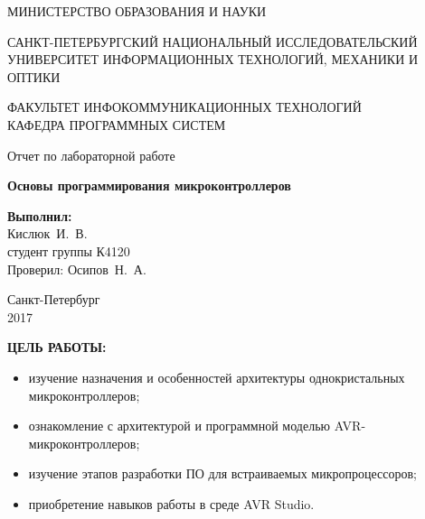 \documentclass[14pt,a4paper]{extreport}
\newcommand{\header}[1]{%
{
\clearpage%
\fontsize{16pt}{14pt}\selectfont
\begin{center}
\textbf{\MakeUppercase{#1}:}
\end{center}
}
}
\newcommand{\labyear}{2017}
\newcommand{\labtitle}{Основы программирования микроконтроллеров}
\newcommand{\prepod}{Осипов~Н.~А.}
\newcommand{\student}{Кислюк~И.~В.}
\begin{document}
	\begin{titlepage}
	\begin{center}	
		\fontsize{14pt}{14pt}\selectfont
		МИНИСТЕРСТВО ОБРАЗОВАНИЯ И НАУКИ\\

		\vspace*{0.6\baselineskip}

		\MakeUppercase{Санкт-Петербургский Национальный Исследовательский Университет Информационных технологий, механики и оптики}		
		
		\vspace*{0.6\baselineskip}
		\MakeUppercase{Факультет Инфокоммуникационных технологий}\\
		\MakeUppercase{Кафедра программных систем}
	
		\vspace*{7\baselineskip}
		\fontsize{19pt}{18pt}\selectfont
		Отчет по лабораторной работе
		
		\fontsize{20pt}{18pt}\selectfont
		\textbf{\labtitle}\\
		\vspace*{1.15\baselineskip}
		\end{center}
	
	\vspace*{2\baselineskip}
	\begin{flushright}
	\fontsize{14pt}{14pt}\selectfont
	\textbf{Выполнил:}\\
	\student\\
	студент группы К4120\\
	Проверил: \prepod\\
	\end{flushright}
	
	\vspace{\fill}
	\begin{center}
	Санкт-Петербург\\
	\vspace{-1ex}
	\labyear
	\end{center}
	
\end{titlepage}

\fontsize{14pt}{14pt}\selectfont

\header{Цель работы}


\begin{itemize}

\item изучение назначения и особенностей архитектуры однокристальных микроконтроллеров;

\item ознакомление с архитектурой и программной моделью AVR-микроконтроллеров;

\item изучение этапов разработки ПО для встраиваемых микропроцессоров;

\item приобретение навыков работы в среде AVR Studio.

\end{itemize}
\end{document}
